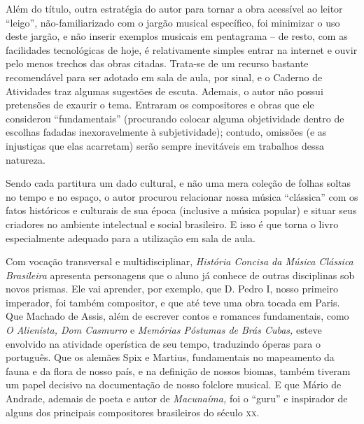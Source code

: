 \documentclass[11pt]{extarticle}
\begin{document}
Além do título, outra estratégia do autor para tornar a obra acessível
ao leitor ``leigo'', não-familiarizado com o jargão musical específico,
foi minimizar o uso deste jargão, e não inserir exemplos musicais em
pentagrama -- de resto, com as facilidades tecnológicas de hoje, é
relativamente simples entrar na internet e ouvir pelo menos trechos das
obras citadas. Trata-se de um recurso bastante recomendável para ser
adotado em sala de aula, por sinal, e o Caderno de Atividades traz
algumas sugestões de escuta. Ademais, o autor não possui pretensões de
exaurir o tema. Entraram os compositores e obras que ele considerou
``fundamentais'' (procurando colocar alguma objetividade dentro de
escolhas fadadas inexoravelmente à subjetividade); contudo, omissões (e
as injustiças que elas acarretam) serão sempre inevitáveis em trabalhos
dessa natureza.

Sendo cada partitura um dado cultural, e não uma mera coleção de folhas
soltas no tempo e no espaço, o autor procurou relacionar nossa música
``clássica'' com os fatos históricos e culturais de sua época (inclusive
a música popular) e situar seus criadores no ambiente intelectual e
social brasileiro. E isso é que torna o livro especialmente adequado
para a utilização em sala de aula.

Com vocação transversal e multidisciplinar, \emph{História Concisa da
Música Clássica Brasileira} apresenta personagens que o aluno já conhece
de outras disciplinas sob novos prismas. Ele vai aprender, por exemplo,
que D. Pedro I, nosso primeiro imperador, foi também compositor, e que
até teve uma obra tocada em Paris. Que Machado de Assis, além de
escrever contos e romances fundamentais, como \emph{O Alienista, Dom
Casmurro} e \emph{Memórias Póstumas de Brás Cubas,} esteve envolvido na
atividade operística de seu tempo, traduzindo óperas para o português.
Que os alemães Spix e Martius, fundamentais no mapeamento da fauna e da
flora de nosso país, e na definição de nossos biomas, também tiveram um
papel decisivo na documentação de nosso folclore musical. E que Mário de
Andrade, ademais de poeta e autor de \emph{Macunaíma,} foi o ``guru'' e
inspirador de alguns dos principais compositores brasileiros do século
\textsc{xx}.
\end{document}
